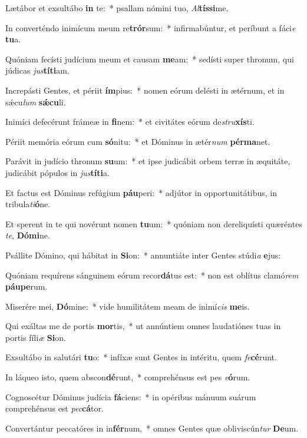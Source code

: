 \item Lætábor et exsultábo \textbf{in} te:~* psallam nómini tuo, \textit{Al}\textbf{tís}\textbf{si}me.
\item In converténdo inimícum meum re\textbf{trór}sum:~* infirmabúntur, et períbunt a fáci\textit{e} \textbf{tu}a.
\item Quóniam fecísti judícium meum et causam \textbf{me}am:~* sedísti super thronum, qui júdicas \textit{jus}\textbf{tí}\textbf{ti}am.
\item Increpásti Gentes, et périit \textbf{ím}pius:~* nomen eórum delésti in ætérnum, et in sǽcu\textit{lum} \textbf{sǽ}\textbf{cu}li.
\item Inimíci defecérunt frámeæ in \textbf{fi}nem:~* et civitátes eórum de\textit{stru}\textbf{xís}ti.
\item Périit memória eórum cum \textbf{só}nitu:~* et Dóminus in ætér\textit{num} \textbf{pér}\textbf{ma}net.
\item Parávit in judício thronum \textbf{su}um:~* et ipse judicábit orbem terræ in æquitáte, judicábit pópulos in \textit{jus}\textbf{tí}\textbf{ti}a.
\item Et factus est Dóminus refúgium \textbf{páu}peri:~* adjútor in opportunitátibus, in tribula\textit{ti}\textbf{ó}ne.
\item Et sperent in te qui novérunt nomen \textbf{tu}um:~* quóniam non dereliquísti quæréntes \textit{te}, \textbf{Dó}\textbf{mi}ne.
\item Psállite Dómino, qui hábitat in \textbf{Si}on:~* annuntiáte inter Gentes stúdi\textit{a} \textbf{e}jus:
\item Quóniam requírens sánguinem eórum recor\textbf{dá}tus est:~* non est oblítus clamó\textit{rem} \textbf{páu}\textbf{pe}rum.
\item Miserére mei, \textbf{Dó}mine:~* vide humilitátem meam de inimí\textit{cis} \textbf{me}is.
\item Qui exáltas me de portis \textbf{mor}tis,~* ut annúntiem omnes laudatiónes tuas in portis fíli\textit{æ} \textbf{Si}on.
\item Exsultábo in salutári \textbf{tu}o:~* infíxæ sunt Gentes in intéritu, quem \textit{fe}\textbf{cé}runt.
\item In láqueo isto, quem abscon\textbf{dé}runt,~* comprehénsus est pes \textit{e}\textbf{ó}rum.
\item Cognoscétur Dóminus judícia \textbf{fá}ciens:~* in opéribus mánuum suárum comprehénsus est \textit{pec}\textbf{cá}tor.
\item Convertántur peccatóres in in\textbf{fér}num,~* omnes Gentes quæ obliviscún\textit{tur} \textbf{De}um.
